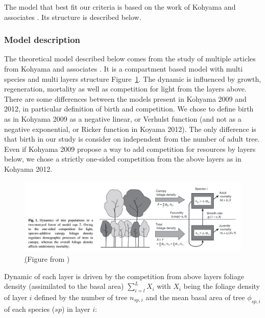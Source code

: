 \documentclass{article}
\begin{document}
The model that best fit our criteria is based on the work of Kohyama and associates \autocite{kohyamaStratificationTheoryPlant2009, kohyamaOnesidedCompetitionLight2012}. Its structure is described below.

\subsubsection{Model description}

The theoretical model described below comes from the study of multiple articles from Kohyama and associates \autocite{kohyamaStratificationTheoryPlant2009, kohyamaOnesidedCompetitionLight2012}.
It is a compartment based model with multi species and multi layers structure Figure~\ref{fig:fig_model}. The dynamic is influenced by growth, regeneration, mortality as well as competition for light from the layers above. There are some differences between the models present in Kohyama 2009 and 2012, in particular definition of birth and competition. We chose to define birth as in Kohyama 2009 as a negative linear, or Verhulst function (and not as a negative exponential, or Ricker function in Koyama 2012). The only difference is that birth in our study is consider on independent from the number of adult tree. Even if Kohyama 2009 propose a way to add competition for resources by layers below, we chose a strictly one-sided competition from the above layers as in Kohyama 2012.

\begin{figure}[h]
    \centering
    \includegraphics[width=\textwidth]{Figure/Fig_model_Kohyama.png}
    \caption{\underline(Figure from \autocite{kohyamaOnesidedCompetitionLight2012})}
    \label{fig:fig_model}
\end{figure}

Dynamic of each layer is driven by the competition from above layers foliage density (assimilated to the basal area) $\sum_{i = l}^{L} X_i$ with $X_i$ being the foliage density of layer $i$ defined by the number of tree $n_{sp,i}$ and the mean basal area of tree $\phi_{sp,i}$ of each species ($sp$) in layer $i$:
\end{document}

